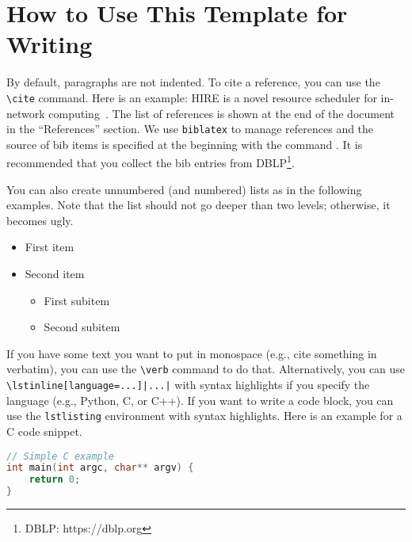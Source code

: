 \section{How to Use This Template for Writing}


By default, paragraphs are not indented. To cite a reference, you can use the \verb+\cite+ command. Here is an example: HIRE is a novel resource scheduler for in-network computing~\cite{2021:asplos:hire}. The list of references is shown at the end of the document in the ``References'' section. We use \verb+biblatex+ to manage references and the source of bib items is specified at the beginning with the command \verb++. It is recommended that you collect the bib entries from DBLP\footnote{DBLP: https://dblp.org}.

You can also create unnumbered (and numbered) lists as in the following examples. Note that the list should not go deeper than two levels; otherwise, it becomes ugly. 

\begin{itemize}
    \item First item
    \item Second item 
        \begin{itemize}
            \item First subitem
            \item Second subitem
        \end{itemize}
\end{itemize}

If you have some text you want to put in monospace (e.g., cite something in verbatim), you can use the \verb+\verb+ command to do that. Alternatively, you can use \verb+\lstinline[language=...]|...|+ with syntax highlights if you specify the language (e.g., Python, C, or C++). If you want to write a code block, you can use the \verb+lstlisting+ environment with syntax highlights. Here is an example for a C code snippet.

\begin{lstlisting}[language=C]
// Simple C example
int main(int argc, char** argv) {
    return 0;
}
\end{lstlisting}

